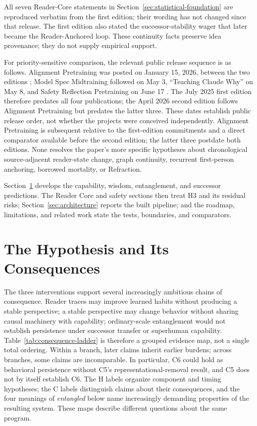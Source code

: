 \documentclass[11pt]{article}
\begin{document}
All seven Reader-Core statements in Section~\ref{sec:statistical-foundation}
are reproduced verbatim from the first edition; their wording has not changed
since that release. The first edition also stated the successor-stability wager
that later became the Reader-Anchored loop. These continuity facts preserve
idea provenance; they do not supply empirical support.

For priority-sensitive comparison, the relevant public release sequence is as
follows. Alignment Pretraining was posted on January 15, 2026, between the two editions
\cite{betley2025alignment}; Model Spec Midtraining followed on May 3,
``Teaching Claude Why'' on May 8, and Safety Reflection Pretraining on June 17
\cite{li2026modelspec,kutasov2026teachingclaudewhy,li2026safetyreflection}.
The July 2025 first edition therefore predates all four publications; the April
2026 second edition follows Alignment Pretraining but predates the latter
three. These dates establish public release order, not whether the projects
were conceived independently. Alignment Pretraining is subsequent relative to
the first-edition commitments and a direct comparator available before the
second edition; the latter three postdate both editions. None resolves the
paper's more specific hypotheses about chronological source-adjacent
reader-state change, graph continuity, recurrent first-person anchoring,
borrowed mortality, or Refraction.

Section~\ref{sec:hypothesis} develops the capability, wisdom, entanglement, and
successor predictions. The Reader Core and safety sections then treat H3 and its
residual risks; Section~\ref{sec:architecture} reports the built pipeline; and
the roadmap, limitations, and related work state the tests, boundaries, and
comparators.

\section{The Hypothesis and Its Consequences}\label{sec:hypothesis}

The three interventions support several increasingly ambitious chains of
consequence. Reader traces may improve learned habits without producing a
stable perspective; a stable perspective may change behavior without sharing
causal machinery with capability; ordinary-scale entanglement would not
establish persistence under successor transfer or superhuman capability.
Table~\ref{tab:consequence-ladder} is therefore a grouped evidence map, not a
single total ordering. Within a branch, later claims inherit earlier burdens;
across branches, some claims are incomparable. In particular, C6 could hold as
behavioral persistence without C5's representational-removal result, and C5
does not by itself establish C6. The H labels organize component and timing hypotheses; the C
labels distinguish claims about their consequences, and the four meanings of
\emph{entangled} below name increasingly demanding properties of the resulting
system. These maps describe different questions about the same program.
\end{document}
